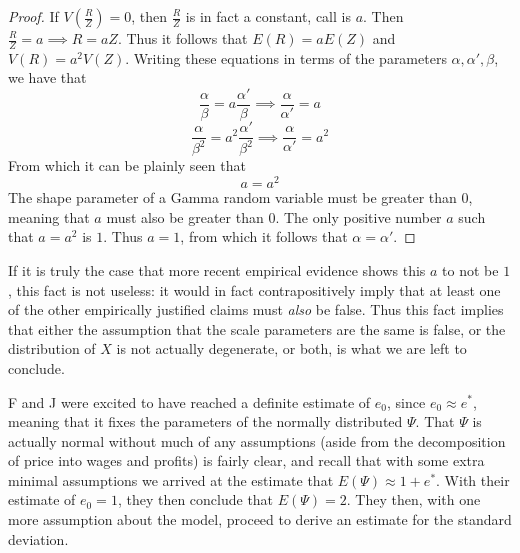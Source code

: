 \documentclass{article}
\theoremstyle{definition}
\theoremstyle{plain}
\theoremstyle{theorem}
\begin{document}
\begin{proof}
	If $V\left( \frac{R}{Z} \right) = 0$, then $\frac{R}{Z}$ is in fact a constant, call is $a$. Then $\frac{R}{Z} = a \implies R = aZ$. Thus it follows that $E(R) = aE(Z)$ and $V(R) = a^2V(Z)$. Writing these equations in terms of the parameters $\alpha, \alpha', \beta$, we have that
	\[ \frac{\alpha}{\beta} = a\frac{\alpha'}{\beta} \implies \frac{\alpha}{\alpha'} = a \]
	\[ \frac{\alpha}{\beta^2} = a^2 \frac{\alpha'}{\beta^2} \implies \frac{\alpha}{\alpha'} = a^2 \]
	From which it can be plainly seen that
	\[ a = a^2 \]
The shape parameter of a Gamma random variable must be greater than $0$, meaning that $a$ must also be greater than $0$. The only positive number $a$ such that $a = a^2$ is $1$. Thus $a = 1$, from which it follows that $\alpha = \alpha'$. 
\end{proof}
If it is truly the case that more recent empirical evidence shows this $a$ to not be $1$, this fact is not useless: it would in fact contrapositively imply that at least one of the other empirically justified claims must \textit{also} be false. Thus this fact implies that either the assumption that the scale parameters are the same is false, or the distribution of $X$ is not actually degenerate, or both, is what we are left to conclude. \par 
F and J were excited to have reached a definite estimate of $e_0$, since $e_0 \approx e^*$, meaning that it fixes the parameters of the normally distributed $\Psi$. That $\Psi$ is actually normal without much of any assumptions (aside from the decomposition of price into wages and profits) is fairly clear, and recall that with some extra minimal assumptions we arrived at the estimate that $E(\Psi) \approx 1+e^*$. With their estimate of $e_0 = 1$, they then conclude that $E(\Psi) = 2$. They then, with one more assumption about the model, proceed to derive an estimate for the standard deviation. \par 
\end{document}
